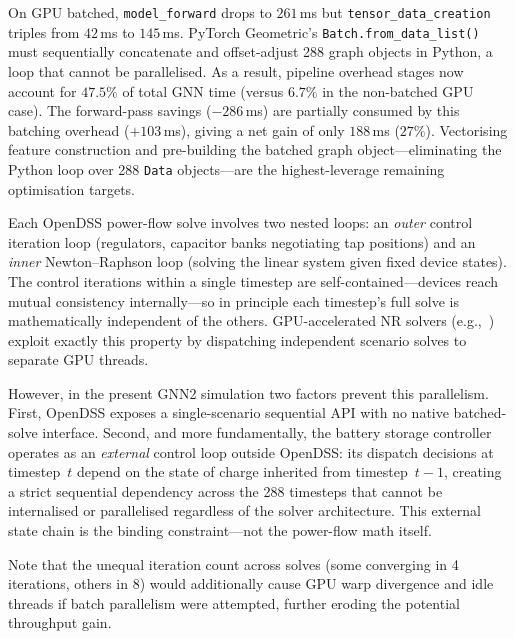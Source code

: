 \documentclass[11pt]{article}
\begin{document}
\begin{description}[style=unboxed, leftmargin=0pt, labelwidth=0pt]
  \item[\textbf{The shifting bottleneck: tensor creation explodes under batching.}]
  On GPU batched, \texttt{model\_forward} drops to $261$\,ms but
  \texttt{tensor\_data\_creation} triples from $42$\,ms to $145$\,ms.
  PyTorch Geometric's \texttt{Batch.from\_data\_list()} must sequentially
  concatenate and offset-adjust 288 graph objects in Python, a loop that
  cannot be parallelised.  As a result, pipeline overhead stages now account
  for $47.5\%$ of total GNN time (versus $6.7\%$ in the non-batched GPU
  case).  The forward-pass savings ($-286$\,ms) are partially consumed by
  this batching overhead ($+103$\,ms), giving a net gain of only $188$\,ms
  ($27\%$).  Vectorising feature construction and pre-building the batched
  graph object---eliminating the Python loop over 288 \texttt{Data}
  objects---are the highest-leverage remaining optimisation targets.

  \item[\textbf{Why the 288 timestep solves cannot be parallelised across steps.}]
  Each OpenDSS power-flow solve involves two nested loops: an \emph{outer} control
  iteration loop (regulators, capacitor banks negotiating tap positions) and an
  \emph{inner} Newton--Raphson loop (solving the linear system given fixed device
  states).  The control iterations within a single timestep are self-contained---devices
  reach mutual consistency internally---so in principle each timestep's full solve is
  mathematically independent of the others.  GPU-accelerated NR solvers
  (e.g.,~\cite{Wang2021GPU}) exploit exactly this property by dispatching independent
  scenario solves to separate GPU threads.

  However, in the present GNN2 simulation two factors prevent this parallelism.
  First, OpenDSS exposes a single-scenario sequential API with no native batched-solve
  interface.  Second, and more fundamentally, the battery storage controller operates
  as an \emph{external} control loop outside OpenDSS: its dispatch decisions at
  timestep~$t$ depend on the state of charge inherited from timestep~$t-1$, creating a
  strict sequential dependency across the 288 timesteps that cannot be internalised or
  parallelised regardless of the solver architecture.  This external state chain is the
  binding constraint---not the power-flow math itself.

  Note that the unequal iteration count across solves (some converging in 4 iterations,
  others in 8) would additionally cause GPU warp divergence and idle threads if batch
  parallelism were attempted, further eroding the potential throughput gain.


\end{description}
\end{document}

